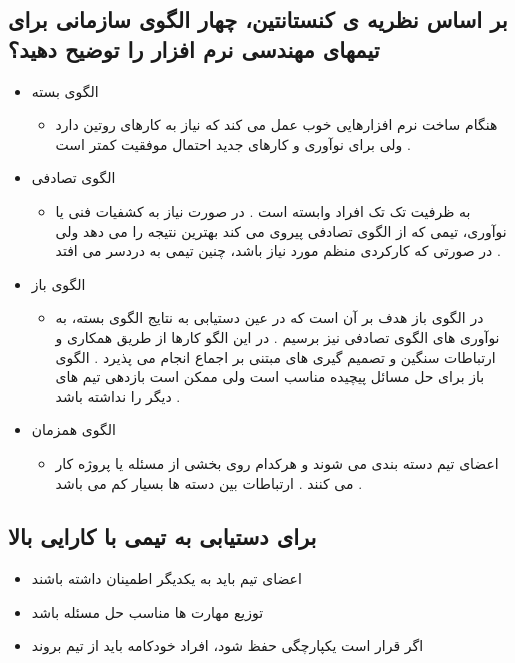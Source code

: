 \documentclass{article}
\begin{document}
\subsection{بر اساس نظریه ی کنستانتین، چهار الگوی سازمانی برای تیمهای مهندسی نرم افزار را توضیح دهید؟}


\begin{itemize}
	\item الگوی بسته
	\begin{itemize}
		\item هنگام ساخت نرم افزارهایی خوب عمل می کند که نیاز به کارهای روتین دارد ولی برای نوآوری و کارهای جدید احتمال موفقیت کمتر است .
	\end{itemize}
	\item الگوی تصادفی
	\begin{itemize}
		\item به ظرفیت تک تک افراد وابسته است . در صورت نیاز به کشفیات فنی یا نوآوری، تیمی که از الگوی تصادفی پیروی می کند بهترین نتیجه را می دهد ولی در صورتی که کارکردی منظم مورد نیاز باشد، چنین تیمی به دردسر می افتد .
	\end{itemize}
	\item الگوی باز
	\begin{itemize}
		\item در الگوی باز هدف بر آن است که در عین دستیابی به نتایج الگوی بسته، به نوآوری های الگوی تصادفی نیز برسیم . در این الگو کارها از طریق همکاری و ارتباطات سنگین و تصمیم گیری های مبتنی بر اجماع انجام می پذیرد . الگوی باز برای حل مسائل پیچیده مناسب است ولی ممکن است بازدهی تیم های دیگر را نداشته باشد .
	\end{itemize}
	\item الگوی همزمان
	\begin{itemize}
		\item اعضای تیم دسته بندی می شوند و هرکدام روی بخشی از مسئله یا پروژه کار می کنند . ارتباطات بین دسته ها بسیار کم می باشد .
	\end{itemize}
\end{itemize}




\subsection{برای دستیابی به تیمی با کارایی بالا}


\begin{itemize}
	\item اعضای تیم باید به یکدیگر اطمینان داشته باشند
	\item توزیع مهارت ها مناسب حل مسئله باشد
	\item اگر قرار است یکپارچگی حفظ شود، افراد خودکامه باید از تیم بروند 
\end{itemize}
\end{document}
